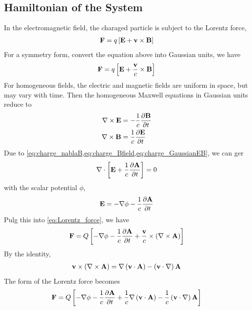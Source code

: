\subsection{Hamiltonian of the System}

In the electromagnetic field, the charaged particle is subject to the Lorentz force, 
\begin{align}
    \mathbf{F} = q \left[ \mathbf{E} + \mathbf{v} \times \mathbf{B} \right]
\end{align}
For a symmetry form, convert the equation above into Gaussian units, we have
\begin{align}
    \mathbf{F} = q \left[ \mathbf{E} + \frac{\mathbf{v}}{c} \times \mathbf{B} \right] \label{eq:Lorentz_force}
\end{align}
For homogeneous fields, the electric and magnetic fields are uniform in space, but may vary with time. Then the homogeneous Maxwell equations in Gaussian units reduce to
\begin{align}
    \nabla \times \mathbf{E} &= - \frac{1}{c} \frac{\partial \mathbf{B}}{\partial t} \label{eq:charge_GaussianEB}\\
    \nabla \times \mathbf{B} &= \frac{1}{c} \frac{\partial \mathbf{E}}{\partial t}
\end{align}
Due to \cref{eq:charge_nablaB,eq:charge_Bfield,eq:charge_GaussianEB}, we can ger 
\begin{align}
    \nabla \cdot \left[\mathbf{E} + \frac{1}{c} \frac{\partial \mathbf{A}}{\partial t} \right] =0
\end{align}
with the scalar potential $\phi$, 
\begin{align}
    \mathbf{E} = - \nabla \phi - \frac{1}{c}\frac{\partial \mathbf{A}}{\partial t} \label{eq:charge_GaussianEfield}
\end{align}
Pulg this into \cref{eq:Lorentz_force}, we have
\begin{align}
    \mathbf{F} = Q \left[- \nabla \phi - \frac{1}{c} \frac{\partial \mathbf{A}}{\partial t} + \frac{\mathbf{v}}{c} \times \left( \nabla \times \mathbf{A} \right) \right]
\end{align}
By the identity,
\begin{align}
    \mathbf{v} \times \left( \nabla \times \mathbf{A} \right) = \nabla \left( \mathbf{v} \cdot \mathbf{A} \right) - \left( \mathbf{v} \cdot \nabla \right) \mathbf{A}
\end{align}
The form of the Lorentz force becomes
\begin{align}
    \mathbf{F} = Q \left[- \nabla \phi - \frac{1}{c} \frac{\partial \mathbf{A}}{\partial t} + \frac{1}{c} \nabla \left( \mathbf{v} \cdot \mathbf{A} \right) - \frac{1}{c} \left( \mathbf{v} \cdot \nabla \right) \mathbf{A} \right]
\end{align}
